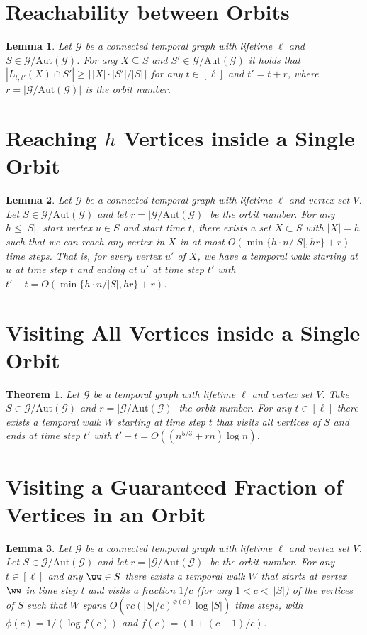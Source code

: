 \documentclass[10pt,a4paper]{article}
\newtheorem{theorem}{Theorem}[section]
\newtheorem{lemma}{Lemma}[section]
\newcommand{\auttg}{\ensuremath{\text{Aut}(\mathcal{G})}}
\newcommand{\torb}{\ensuremath{\mathcal{G}/\auttg}}
\begin{document}
{\section{Reachability between Orbits}
\begin{lemma} Let
    $\mathcal{G}$ be a connected temporal graph with lifetime $\ell$ and $S \in
    \torb$. For any $X \subseteq S$ and $S' \in \torb$ it holds that $|L_{t,
    t'}(X) \cap S'| \geq  \lceil |X| \cdot |S'|/|S| \rceil$ for any $t \in
    [\ell]$ and $t'=t+r$, where $r=|\torb|$ is the orbit number.
\end{lemma}
\prooflaneorbit

\section{Reaching $h$ Vertices inside a Single Orbit}
\begin{lemma} 
Let $\mathcal{G}$ be a connected temporal graph with lifetime $\ell$ and vertex
set $V$. Let $S \in \torb$ and let $r=|\torb|$ be the orbit number. For any $h
\leq |S|$, start vertex {$u \in S$} {and start time $t$}, there exists a set $X
\subset S$ {with $|X|=h$} such that we can reach any vertex in $X$ in at most
$O(\min\{h \cdot n / |S|, h r\}+r)$ time steps. That is, for every vertex $u'$
of $X$, we have a temporal walk starting at $u$ at time step $t$ and ending at
$u'$ at time step $t'$ with $t'-t=O(\min\{h \cdot n / |S|, h r\}+r)$.
 \end{lemma}
\proofnextreachable

\section{Visiting All Vertices inside a Single Orbit}
\begin{theorem} Let $\mathcal{G}$ be a temporal graph
    with lifetime $\ell$ and vertex set $V$. Take $S \in \torb$ and $r=|\torb|$
    the orbit number. For any $t\in[\ell]$ there exists a temporal walk $W$
    starting at time step $t$ that visits all vertices of $S$ and ends at time
    step $t'$ with $t'-t=O((n^{5/3}+rn)\log n)$. 
\end{theorem}
\prooforbitexplore

\section{Visiting a Guaranteed Fraction of Vertices in an Orbit}
\begin{lemma} Let $\mathcal{G}$ be a connected
    temporal graph with lifetime $\ell$ and vertex set $V$. Let $S \in \torb$
    and let $r=|\torb|$ be the orbit number. For any $t\in[\ell]$ and any
    {$\ww \in S$} there exists a temporal walk $W$ that starts at vertex
    $\ww$ in time step $t$ and visits a fraction $1/c$ (for any $1 < c <\
    |S|$) of the vertices of $S$ such that $W$ spans $O(rc(|S|/c)^{\phi(c)}
    \log |S|)$ time steps, with $\phi(c)=1/(\log {f(c)})$ and
    $f(c)=(1+(c-1)/c)$.
\end{lemma}
\proofvtexplorationub

}
\end{document}
